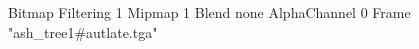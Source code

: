 {Bitmap
	{Filtering 1}
	{Mipmap 1}
	{Blend none}
	{AlphaChannel 0}
	{Frame "ash_tree1#autlate.tga"}
}
